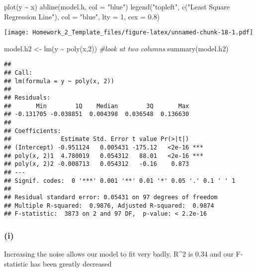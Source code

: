 \documentclass[
]{article}
\newenvironment{Shaded}{\begin{snugshade}}{\end{snugshade}}
\newcommand{\AttributeTok}[1]{\textcolor[rgb]{0.77,0.63,0.00}{#1}}
\newcommand{\CommentTok}[1]{\textcolor[rgb]{0.56,0.35,0.01}{\textit{#1}}}
\newcommand{\DecValTok}[1]{\textcolor[rgb]{0.00,0.00,0.81}{#1}}
\newcommand{\FloatTok}[1]{\textcolor[rgb]{0.00,0.00,0.81}{#1}}
\newcommand{\FunctionTok}[1]{\textcolor[rgb]{0.00,0.00,0.00}{#1}}
\newcommand{\NormalTok}[1]{#1}
\newcommand{\OtherTok}[1]{\textcolor[rgb]{0.56,0.35,0.01}{#1}}
\newcommand{\SpecialCharTok}[1]{\textcolor[rgb]{0.00,0.00,0.00}{#1}}
\newcommand{\StringTok}[1]{\textcolor[rgb]{0.31,0.60,0.02}{#1}}
\begin{document}
\begin{Shaded}
\begin{Highlighting}[]
\FunctionTok{plot}\NormalTok{(y }\SpecialCharTok{\textasciitilde{}}\NormalTok{ x)}
\FunctionTok{abline}\NormalTok{(model.h, }\AttributeTok{col =} \StringTok{"blue"}\NormalTok{)}
\FunctionTok{legend}\NormalTok{(}\StringTok{"topleft"}\NormalTok{, }\FunctionTok{c}\NormalTok{(}\StringTok{"Least Square Regression Line"}\NormalTok{), }\AttributeTok{col =} \StringTok{"blue"}\NormalTok{, }\AttributeTok{lty =} \DecValTok{1}\NormalTok{, }\AttributeTok{cex =} \FloatTok{0.8}\NormalTok{)}
\end{Highlighting}
\end{Shaded}

\texttt{[image: Homework\_2\_Template\_files/figure-latex/unnamed-chunk-18-1.pdf]}

\begin{Shaded}
\begin{Highlighting}[]
\NormalTok{model.h2 }\OtherTok{\textless{}{-}} \FunctionTok{lm}\NormalTok{(y }\SpecialCharTok{\textasciitilde{}} \FunctionTok{poly}\NormalTok{(x,}\DecValTok{2}\NormalTok{)) }\CommentTok{\#look at two columns}
\FunctionTok{summary}\NormalTok{(model.h2)}
\end{Highlighting}
\end{Shaded}

\begin{verbatim}
## 
## Call:
## lm(formula = y ~ poly(x, 2))
## 
## Residuals:
##       Min        1Q    Median        3Q       Max 
## -0.131705 -0.038851  0.004398  0.036548  0.136630 
## 
## Coefficients:
##              Estimate Std. Error t value Pr(>|t|)    
## (Intercept) -0.951124   0.005431 -175.12   <2e-16 ***
## poly(x, 2)1  4.780019   0.054312   88.01   <2e-16 ***
## poly(x, 2)2 -0.008713   0.054312   -0.16    0.873    
## ---
## Signif. codes:  0 '***' 0.001 '**' 0.01 '*' 0.05 '.' 0.1 ' ' 1
## 
## Residual standard error: 0.05431 on 97 degrees of freedom
## Multiple R-squared:  0.9876, Adjusted R-squared:  0.9874 
## F-statistic:  3873 on 2 and 97 DF,  p-value: < 2.2e-16
\end{verbatim}

\hypertarget{i}{%
\subsubsection{(i)}\label{i}}

Increasing the noise allows our model to fit very badly. R\^{}2 is 0.34
and our F-statistic has been greatly decreased
\end{document}
